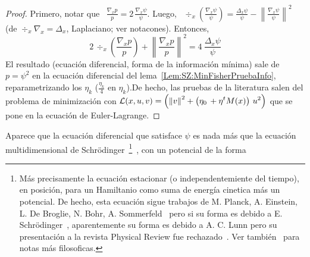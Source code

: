 \begin{proof}
Primero, notar que  \ $\frac{\nabla_x p}{p} = 2  \, \frac{\nabla_x \psi}{\psi}$.
Luego,     \    $\div_x     \left(     \frac{\nabla_x    \psi}{\psi}     \right)
= \frac{\Delta_x  \psi}{\psi} -  \left\| \frac{\nabla_x  \psi}{\psi} \right\|^2$
(de $\div_x \nabla_x = \Delta_x$, Laplaciano; ver notacones). Entonces,
%
\[
2  \,  \div_x  \left(  \frac{\nabla_x p}{p}  \right)  +  \left\|  \frac{\nabla_x
p}{p} \right\|^2 = 4 \: \frac{\Delta_x \psi}{\psi}
\]
%
El resultado (ecuaci\'on  diferencial, forma de la  informaci\'on m\'inima) sale
de     $p     =     \psi^2$     en     la     ecuaci\'on     diferencial     del
lema~\ref{Lem:SZ:MinFisherPruebaInfo},     reparametrizando     los     $\eta_k$
($\frac{\eta_k}{4}$ en $\eta_k$).\newline De hecho, las pruebas de la literatura
salen  del  problema  de  minimizaci\'on  con  $\displaystyle  \mathcal{L}(x  ,  u  ,  v)
=  \left( \left\|  v \right\|^2  + \left(  \eta_0 \,  + \eta^t  M(x) \right)  \,
u^2 \right)$ que se pone en la ecuaci\'on de Euler-Lagrange.
%
\end{proof}
%
Aparece que la ecuaci\'on diferencial que  satisface $\psi$ es nada m\'as que la
ecuaci\'on  multidimensional  de Schr\"odinger~\footnote{M\'as  precisamente  la
ecuaci\'on estacionar (o independentemiente del  tiempo), en posici\'on, para un
Hamiltanio como  suma de energ\'ia cinetica  m\'as un potencial. De  hecho, esta
ecuaci\'on sigue trabajos de M.  Planck, A. Einstein, L. De Broglie, N. Bohr, A.
Sommerfeld~\cite{Bro25}    pero    si    su     forma    es    debido    a    E.
Schr\"odinger~\cite{Sch26, Moo17},  aparentemente su  forma es  debido a  A.  C.
Lunn   pero   su    presentaci\'on   a   la   revista    Physical   Review   fue
rechazado~\cite{Kam85, WeiWei97, WeiIli08}.  Ver tambi\'en~\cite{Sch51, Sch92,
Sch14}  para  notas  m\'as filosoficas.}~\cite{Dir58,  Bay73,  LerTri91,  Omn94,
Gri05}, con un potencial de la forma
